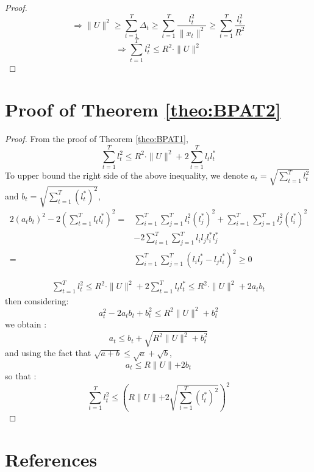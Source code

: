\documentclass[preprint,12pt,authoryear]{elsarticle}
\begin{document}
\begin{proof}
	\[\Rightarrow \parallel{U}\parallel^2 \geqslant \sum_{t=1}^{T}\Delta_t \geqslant \sum_{t=1}^{T}  \frac{l_t^2}{\parallel{x_t}\parallel^2}
	\geqslant 
	\sum_{t=1}^{T}  \frac{l_t^2}{R^2}
	\]
	\[\Rightarrow\sum_{t=1}^{T} l_t^2 \leqslant R^2 \cdot \parallel{U}\parallel^2\]
\end{proof}

\section{Proof of Theorem \ref{theo:BPAT2}}\label{app:thm2}
\begin{proof}
	From the proof of Theorem \ref{theo:BPAT1}, 
	\[\sum_{t=1}^{T}l_t^2 \leqslant R^2\cdot \parallel{U}\parallel^2 + 2\sum_{t=1}^{T}l_t l_t^{\ast}\]
	To upper bound the right side of the above inequality, we denote $a_t = \sqrt{\sum_{t=1}^{T}l_t^2}$ and $b_t = \sqrt{\sum_{t=1}^{T}(l_t^{\ast})^2}$, 
	\begin{align}
	2(a_tb_t)^2-2(\sum_{t=1}^{T}l_tl_t^{\ast})^2 =& \sum_{i=1}^{T}\sum_{j=1}^{T}l_i^2(l_j^{\ast})^2+\sum_{i=1}^{T}\sum_{j=1}^{T}l_j^2(l_i^{\ast})^2 \nonumber\\
	&- 2\sum_{i=1}^{T}\sum_{j=1}^{T}l_il_jl_i^{\ast}l_j^{\ast}\nonumber\\
	=& \sum_{i=1}^{T}\sum_{j=1}^{T}(l_il_j^{\ast}-l_jl_i^{\ast})^2 \geqslant 0 \nonumber
	\end{align}
	
	\begin{align}
	\sum_{t=1}^{T}l_t^2 \leqslant R^2 \cdot \parallel{U}\parallel^2+2\sum_{t=1}^{T}l_tl_t^{\ast}\leqslant R^2 \cdot \parallel{U}\parallel^2+2a_tb_t\nonumber
	\end{align}
	then considering:
	\[a_t^2 -2 a_tb_t+b_t^2\leqslant R^2\parallel{U}\parallel^2+b_t^2\]
	we obtain :
	\[a_t \leqslant b_t+\sqrt{R^2\parallel{U}\parallel^2+b_t^2}\]
	and using the fact that $\sqrt{a+b}\leqslant \sqrt{a}+\sqrt{b}$,
	\[a_t \leqslant R\parallel{U}\parallel+2 b_t\]
	so that :
	\[\sum_{t=1}^{T}l_t^2 \leqslant \left(R\parallel{U}\parallel+2 \sqrt{\sum_{t=1}^{T}(l_t^{\ast})^2}\right)^2 \]
\end{proof}
\section*{References}
 

\end{document}
